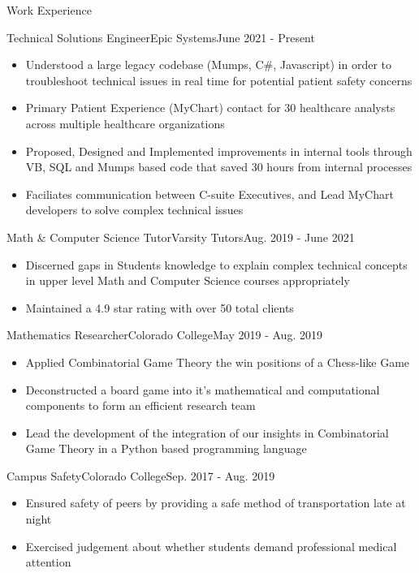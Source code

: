 \begin{cvsection}{Work Experience}
	\begin{cvsubsection}{Technical Solutions Engineer}{Epic Systems}{June 2021 - Present}			
		\begin{itemize}
			\item Understood a large legacy codebase (Mumps, C\#, Javascript) in order to troubleshoot technical issues in real time for potential patient safety concerns
			\item Primary Patient Experience (MyChart) contact for 30 healthcare analysts across multiple healthcare organizations
			\item Proposed, Designed and Implemented improvements in internal tools through VB, SQL and Mumps based code that saved 30 hours from internal processes
			\item Faciliates communication between C-suite Executives, and Lead MyChart developers to solve complex technical issues
		\end{itemize}
	\end{cvsubsection}
	
	\begin{cvsubsection}{Math \& Computer Science Tutor}{Varsity Tutors}{Aug. 2019 - June 2021}	
		\begin{itemize}
			\item Discerned gaps in Students knowledge to explain complex technical concepts in upper level Math and Computer Science courses appropriately
			\item Maintained a 4.9 star rating with over 50 total clients
		\end{itemize}
	\end{cvsubsection}
	
	\begin{cvsubsection}{Mathematics Researcher}{Colorado College}{May 2019 - Aug. 2019}
	\begin{itemize}
		\item Applied Combinatorial Game Theory the win positions of a Chess-like Game
		\item Deconstructed a board game into it’s mathematical and computational components to form an efficient research team
		\item Lead the development of the integration of our insights in Combinatorial Game Theory in a Python based programming language
		\end{itemize}
	\end{cvsubsection}
	
		\begin{cvsubsection}{Campus Safety}{Colorado College}{Sep. 2017 - Aug. 2019}
	\begin{itemize}
		\item Ensured safety of peers by providing a safe method of transportation late at night
		\item Exercised judgement about whether students demand professional medical attention
		\end{itemize}
	\end{cvsubsection}
	
\end{cvsection}



